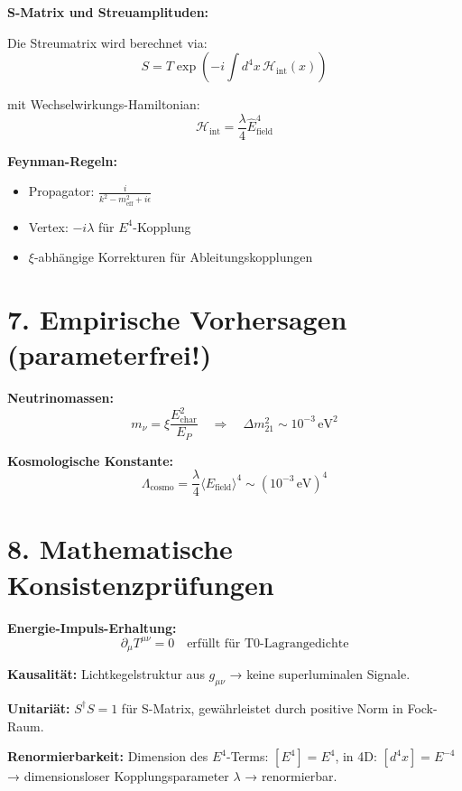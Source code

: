 	\textbf{S-Matrix und Streuamplituden:}
	
	Die Streumatrix wird berechnet via:
	\[
	S = T \exp\left(-i \int d^4x \, \mathcal{H}_{\text{int}}(x)\right)
	\]
	
	mit Wechselwirkungs-Hamiltonian:
	\[
	\mathcal{H}_{\text{int}} = \frac{\lambda}{4} \hat{E}_{\text{field}}^4
	\]
	
	\textbf{Feynman-Regeln:}
	\begin{itemize}
		\item Propagator: $\frac{i}{k^2 - m_{\text{eff}}^2 + i\epsilon}$
		\item Vertex: $-i\lambda$ für $E^4$-Kopplung
		\item $\xi$-abhängige Korrekturen für Ableitungskopplungen
	\end{itemize}
	
	\section*{7. Empirische Vorhersagen (parameterfrei!)}
	
	\textbf{Neutrinomassen:}
	\[
	m_\nu = \xi \frac{E_{\text{char}}^2}{E_P} \quad \Rightarrow \quad \Delta m_{21}^2 \sim 10^{-3} \, \text{eV}^2
	\]
	
	\textbf{Kosmologische Konstante:}
	\[
	\Lambda_{\text{cosmo}} = \frac{\lambda}{4} \langle E_{\text{field}} \rangle^4 \sim (10^{-3} \, \text{eV})^4
	\]
	

	
	\section*{8. Mathematische Konsistenzprüfungen}
	
	\textbf{Energie-Impuls-Erhaltung:}
	\[
	\partial_\mu T^{\mu\nu} = 0 \quad \text{erfüllt für T0-Lagrangedichte}
	\]
	
	\textbf{Kausalität:} Lichtkegelstruktur aus $g_{\mu\nu}$ → keine superluminalen Signale.
	
	\textbf{Unitariät:} $S^\dagger S = 1$ für S-Matrix, gewährleistet durch positive Norm in Fock-Raum.
	
	\textbf{Renormierbarkeit:} Dimension des $E^4$-Terms: $[E^4] = E^4$, in 4D: $[d^4x] = E^{-4}$ → dimensionsloser Kopplungsparameter $\lambda$ → renormierbar.
	